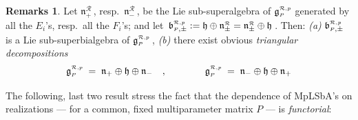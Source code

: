 \documentclass[12pt,reqno,twoside,a4paper]{amsart}
\numberwithin{equation}{section}
\theoremstyle{definition}
\newtheorem{rmks}[lema]{Remarks}
\newtheorem{free text}[lema]{}
\theoremstyle{remark}
\newcommand{\R}{{\mathcal R}}
\def \Ppicc {{\scriptscriptstyle P}}
\def \Rpicc {{\scriptscriptstyle \R}}
\def \liegRpP{\mathfrak{g}^{\raise1pt\hbox{$ \scriptscriptstyle \mathcal{R},p $}}_\Ppicc}
\def \lieb{\mathfrak{b}}
\def \lieh{\mathfrak{h}}
\def \lien{\mathfrak{n}}
\theoremstyle{plain}
\begin{document}
\begin{rmks}  \label{rmks: sub-MpLSbA's & triang-decomp.'s}
%
 Let  $ \lien^\Rpicc_+ \, $,  resp.\  $ \lien^\Rpicc_- \, $,  be the Lie sub-superalgebra of
 $ \liegRpP $
 generated by all the  $ E_i $'s,  resp.\ all the  $ F_i $'s; and let  $ \, \lieb^{\raise1pt\hbox{$ \scriptscriptstyle \R,p $}}_{\Ppicc,\pm} := \lieh \oplus \lien^\Rpicc_\pm = \lien^\Rpicc_\pm \oplus \lieh \, $.  Then:
%
 \vskip3pt
%
   \textit{(a)}\;  $ \lieb^{\raise1pt\hbox{$ \scriptscriptstyle \R,p $}}_{\Ppicc,\pm} $
   is a Lie sub-superbialgebra of  $ \liegRpP \, $,
%
 \vskip3pt
%
   \textit{(b)}\;  there exist obvious  \textsl{triangular decompositions}
%
\begin{equation}  \label{eq: triang-decomp's_Lie-bialg's}
%
  \liegRpP  \; = \;  \lien_+ \oplus \lieh \oplus \lien_-  \quad ,  \qquad \qquad  \liegRpP  \;
  = \;  \lien_- \oplus \lieh \oplus \lien_+
%
\end{equation}
%
%
\end{rmks}

\vskip9pt

   The following, last two result stress the fact that the dependence of MpLSbA's
   on realizations   --- for a common, fixed multiparameter matrix  $ P $  ---
   is  \textsl{functorial\/}:

\vskip13pt
\end{document}
